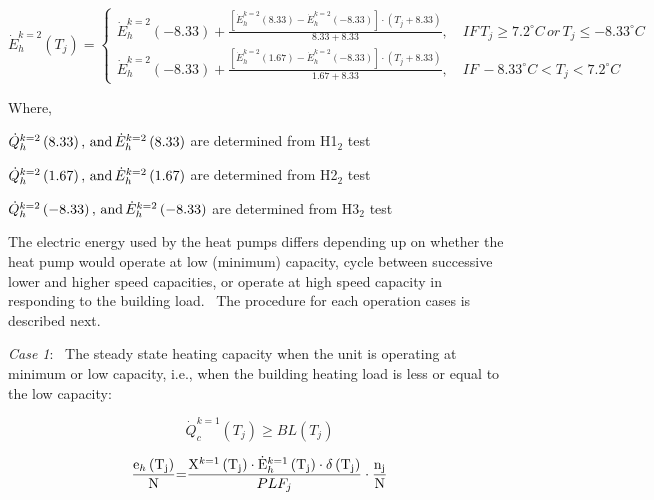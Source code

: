 \begin{equation}
\dot E_h^{k = 2}({T_j}) = \left\{ \begin{array}{l}\dot E_h^{k = 2}( - 8.33) + \frac{{\left[ {\dot E_h^{k = 2}(8.33) - \dot E_h^{k = 2}( - 8.33)} \right] \cdot \left( {{T_j} + 8.33} \right)}}{{8.33 + 8.33}},\quad IF\,{T_j} \ge 7.2^\circ C\,or\,{T_j} \le  - 8.33^\circ C\\\dot E_h^{k = 2}( - 8.33) + \frac{{\left[ {\dot E_h^{k = 2}(1.67) - \dot E_h^{k = 2}( - 8.33)} \right] \cdot \left( {{T_j} + 8.33} \right)}}{{1.67 + 8.33}},\quad IF\, - 8.33^\circ C < {T_j} < 7.2^\circ C\end{array} \right.
\end{equation}

Where,

\(\dot Q_h^{k = 2}\left( {{\rm{8}}{\rm{.33}}} \right),\,{\rm{and}}\,\dot E_h^{k = 2}\left( {{\rm{8}}{\rm{.33}}} \right)\) are determined from H1\(_{2}\) test

\(\dot Q_h^{k = 2}\left( {{\rm{1}}{\rm{.67}}} \right),\,{\rm{and}}\,\dot E_h^{k = 2}\left( {{\rm{1}}{\rm{.67}}} \right)\) are determined from H2\(_{2}\) test

\(\dot Q_h^{k = 2}\left( {{\rm{ - 8}}{\rm{.33}}} \right),\,{\rm{and}}\,\dot E_h^{k = 2}\left( {{\rm{ - 8}}{\rm{.33}}} \right)\) are determined from H3\(_{2}\) test

The electric energy used by the heat pumps differs depending up on whether the heat pump would operate at low (minimum) capacity, cycle between successive lower and higher speed capacities, or operate at high speed capacity in responding to the building load.~ The procedure for each operation cases is described next.

\emph{Case 1}:~ The steady state heating capacity when the unit is operating at minimum or low capacity, i.e., when the building heating load is less or equal to the low capacity:

\begin{equation}
\dot Q_c^{k = 1}\left( {{T_j}} \right) \ge BL\left( {{T_j}} \right)
\end{equation}

\begin{equation}
\frac{{{{\rm{e}}_h}\left( {{{\rm{T}}_{\rm{j}}}} \right)}}{{\rm{N}}}{\rm{ = }}\frac{{{{\rm{X}}^{k = 1}}\left( {{{\rm{T}}_{\rm{j}}}} \right) \cdot {\rm{\dot E}}_h^{k = 1}\left( {{{\rm{T}}_{\rm{j}}}} \right) \cdot {\rm{\delta }}\left( {{{\rm{T}}_{\rm{j}}}} \right)}}{{PL{F_j}}} \cdot \frac{{{{\rm{n}}_{\rm{j}}}}}{{\rm{N}}}
\end{equation}


